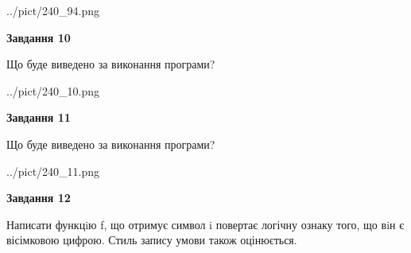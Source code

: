 \documentclass[12pt, ukrainian]{article}
\begin{document}
{\begin {large}
\begin{center}
	{../pict/240_94.png}
\end{center}
\newpage

{\begin {center}\textbf{Завдання 10}\end {center}}

Що буде виведено за виконання програми?\par
\begin{center}
	{../pict/240_10.png}
\end{center}
\newpage

{\begin {center}\textbf{Завдання 11}\end {center}}

Що буде виведено за виконання програми?\par
\begin{center}
	{../pict/240_11.png}
\end{center}
\newpage

{\begin {center}\textbf{Завдання 12}\end {center}}


Написати функцiю f, що отримує символ i повертає логічну ознаку того, що вiн є вісімковою цифрою. Стиль запису умови також оцінюється.\par
\newpage

\end {large}}
\end{document}
